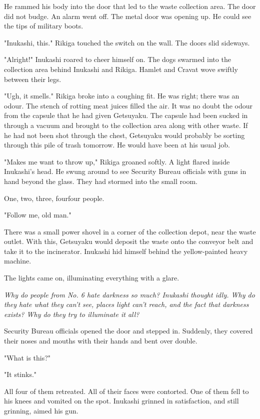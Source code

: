 He rammed his body into the door that led to the waste collection area.
The door did not budge. An alarm went off. The metal door was opening
up. He could see the tips of military boots.

"Inukashi, this." Rikiga touched the switch on the wall. The doors slid
sideways.

"Alright!" Inukashi roared to cheer himself on. The dogs swarmed into
the collection area behind Inukashi and Rikiga. Hamlet and Cravat wove
swiftly between their legs.

"Ugh, it smells." Rikiga broke into a coughing fit. He was right; there
was an odour. The stench of rotting meat juices filled the air. It was
no doubt the odour from the capsule that he had given Getsuyaku. The
capsule had been sucked in through a vacuum and brought to the
collection area along with other waste. If he had not been shot through
the chest, Getsuyaku would probably be sorting through this pile of
trash tomorrow. He would have been at his usual job.

"Makes me want to throw up," Rikiga groaned softly. A light flared
inside Inukashi's head. He swung around to see Security Bureau officials
with guns in hand beyond the glass. They had stormed into the small
room.

One, two, three, four\el four people.

"Follow me, old man."

There was a small power shovel in a corner of the collection depot, near
the waste outlet. With this, Getsuyaku would deposit the waste onto the
conveyor belt and take it to the incinerator. Inukashi hid himself
behind the yellow-painted heavy machine.

The lights came on, illuminating everything with a glare.

\emph{Why do people from No. 6 hate darkness so much? Inukashi thought idly.
Why do they hate what they can't see, places light can't reach, and the
fact that darkness exists? Why do they try to illuminate it all?}

Security Bureau officials opened the door and stepped in. Suddenly, they
covered their noses and mouths with their hands and bent over double.

"What is this?"

"It stinks."

All four of them retreated. All of their faces were contorted. One of
them fell to his knees and vomited on the spot. Inukashi grinned in
satisfaction, and still grinning, aimed his gun.

